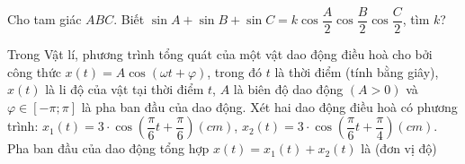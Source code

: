 \begin{ex}%
	Cho tam giác $ABC$. Biết $\sin A+\sin B+\sin C=k\cos \dfrac{A}{2}\cos \dfrac{B}{2}\cos \dfrac{C}{2}$, tìm $k$?
\end{ex}

\begin{ex}%
	Trong Vật lí, phương trình tổng quát của một vật dao động điều hoà cho bởi công thức $x(t)=A \cos (\omega t+\varphi)$, trong đó $t$ là thời điểm (tính bằng giây), $x(t)$ là li độ của vật tại thời điểm $t$, $A$ là biên độ dao động $(A>0)$ và $\varphi \in[-\pi; \pi]$ là pha ban đầu của dao động. Xét hai dao động điều hoà có phương trình: $x_1(t)=3 \cdot \cos \left(\dfrac{\pi}{6} t+\dfrac{\pi}{6}\right)(cm)$, $x_2(t)=3 \cdot \cos \left(\dfrac{\pi}{6} t+\dfrac{\pi}{4}\right)(cm)$. Pha ban đầu của dao động tổng hợp $x(t)=x_1(t)+x_2(t)$ là (đơn vị độ)
\end{ex}
